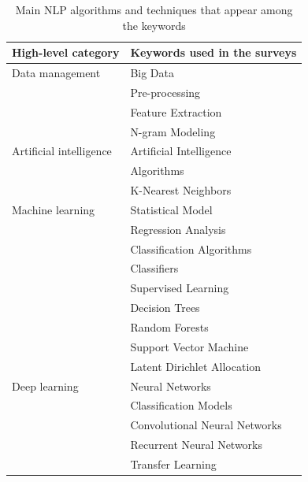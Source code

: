 \begin{table}[bht]
    \centering
    \tabulinesep=1.2mm
    \caption{Main NLP algorithms and techniques that appear among the keywords}
    \begin{tabu}{X[r]X[l]}
        High-level category     & Keywords used in the surveys  \\
        \toprule
        Data management         & Big Data                      \\
                                & Pre-processing                \\
                                & Feature Extraction            \\
                                & N-gram Modeling               \\
        Artificial intelligence & Artificial Intelligence       \\
                                & Algorithms                    \\
                                & K-Nearest Neighbors           \\
        Machine learning        & Statistical Model             \\
                                & Regression Analysis           \\
                                & Classification Algorithms     \\
                                & Classifiers                   \\
                                & Supervised Learning           \\
                                & Decision Trees                \\
                                & Random Forests                \\
                                & Support Vector Machine        \\
                                & Latent Dirichlet Allocation   \\
        Deep learning           & Neural Networks               \\
                                & Classification Models         \\
                                & Convolutional Neural Networks \\
                                & Recurrent Neural Networks     \\
                                & Transfer Learning             \\
        \bottomrule
    \end{tabu}
    \label{table:nlp-tools}
\end{table}

